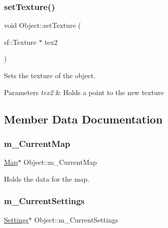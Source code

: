 \subsubsection{\texorpdfstring{set\+Texture()}{setTexture()}}
{\footnotesize\ttfamily void Object\+::set\+Texture (\begin{DoxyParamCaption}\item[{sf\+::\+Texture $\ast$}]{tex2 }\end{DoxyParamCaption})}



Sets the texture of the object. 


\begin{DoxyParams}{Parameters}
{\em tex2} & Holds a point to the new texture \\
\hline
\end{DoxyParams}


\subsection{Member Data Documentation}
\mbox{\label{class_object_a0ea9a20ed14789cabfa6a4b2d56b6c4f}} 
\subsubsection{\texorpdfstring{m\+\_\+\+Current\+Map}{m\_CurrentMap}}
{\footnotesize\ttfamily \hyperlink{class_map}{Map}$\ast$ Object\+::m\+\_\+\+Current\+Map\hspace{0.3cm}{\ttfamily [protected]}}



Holds the data for the map. 

\mbox{\label{class_object_ae56470c16db195a9b059fa8482333770}} 
\subsubsection{\texorpdfstring{m\+\_\+\+Current\+Settings}{m\_CurrentSettings}}
{\footnotesize\ttfamily \hyperlink{class_settings}{Settings}$\ast$ Object\+::m\+\_\+\+Current\+Settings\hspace{0.3cm}{\ttfamily [protected]}}



